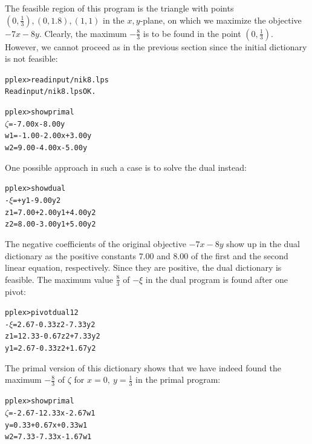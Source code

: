 \documentclass[ukenglish,a4]{article}
\begin{document}
The feasible region of this program is the
triangle with points $(0,\frac{1}{3}),(0,1.8),(1,1)$
in the $x,y$-plane, on which we maximize the objective $-7x-8y$.
Clearly, the maximum $-\frac{8}{3}$ is to be found in the point $(0,\frac{1}{3})$.
However, we cannot proceed as in the previous section since the
initial dictionary is not feasible:
\begin{alltt}
pplex> read input/nik8.lps
Read input/nik8.lps OK.

pplex> show primal
 \(\zeta\) =        - 7.00x - 8.00y
w1 = - 1.00 - 2.00x + 3.00y
w2 =   9.00 - 4.00x - 5.00y
\end{alltt}
One possible approach in such a case is to solve the dual instead:
\begin{alltt}
pplex> show dual
-\(\xi\) =      +     y1 - 9.00y2
z1 = 7.00 + 2.00y1 + 4.00y2
z2 = 8.00 - 3.00y1 + 5.00y2
\end{alltt}
The negative coefficients of the original objective $-7x-8y$ show up in the dual
dictionary as the positive constants $7.00$ and $8.00$ of the first and the second 
linear equation, respectively. Since they are positive, the dual dictionary is feasible.
The maximum value $\frac{8}{3}$ of \(-\xi\) in the dual program is found after one pivot:
\begin{alltt}
pplex> pivot dual 1 2
-\(\xi\) =  2.67 - 0.33z2 - 7.33y2
z1 = 12.33 - 0.67z2 + 7.33y2
y1 =  2.67 - 0.33z2 + 1.67y2
\end{alltt}
The primal version of this dictionary shows that we have indeed found the
maximum $-\frac{8}{3}$ of $\zeta$ for $x=0,~y=\frac{1}{3}$ in the primal program:
\begin{alltt}
pplex> show primal
 \(\zeta\) = - 2.67 - 12.33x - 2.67w1
 y =   0.33 +  0.67x + 0.33w1
w2 =   7.33 -  7.33x - 1.67w1
\end{alltt}
\end{document}
